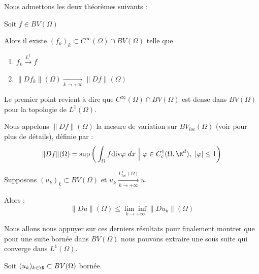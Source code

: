 \vspace{1em}

Nous admettons les deux théorèmes suivants :

\begin{theorembox}
\begin{theorem}
    Soit $f \in BV(\Omega)$

    Alors il existe $(f_k)_k \subset C^{\infty}(\Omega) \cap BV(\Omega)$ telle que 
    \begin{enumerate}
        \item $f_k \xrightarrow{L^1} f$
        \item $\| Df_k \| (\Omega) \underset{k \to +\infty}{\longrightarrow} \| Df \| (\Omega)$
    \end{enumerate}

\end{theorem}
\end{theorembox}

\begin{remarkbox}
\begin{remark}
    Le premier point revient à dire que $C^{\infty}(\Omega) \cap BV(\Omega)$ est dense dans $BV(\Omega)$ pour la topologie de $L^1(\Omega)$.

    \vspace{1em}
    Nous appelons $\|Df\|(\Omega)$ la mesure de variation sur $BV_{loc}(\Omega)$ (voir \cite{Evans} pour plus de détails), définie par :
    $$\|Df\| (\Omega) = \sup \bigg(\int_{\Omega} f \text{div}\varphi \ dx \ \Big| \ \varphi \in C^1_c(\Omega,\R^d), \ |\varphi| \leq 1 \bigg)$$
\end{remark}
\end{remarkbox}

\begin{theorembox}
\begin{theorem}
    
    Supposons $(u_k)_k \subset BV(\Omega)$ et $u_k \xrightarrow[k \to +\infty]{L^1_{loc}(\Omega)} u$.

    Alors :
    $$ \| Du \|(\Omega) \leq \underset{k \to +\infty}{\lim \inf}\|Du_k\|(\Omega) $$

\end{theorem}
\end{theorembox}

Nous allons nous appuyer sur ces derniers résultats pour finalement montrer que pour une suite bornée dans $BV(\Omega)$ nous pouvons extraire une sous suite qui converge dans $L^1(\Omega)$. 

Soit $(u_k)_{k \in \N} \subset BV(\Omega)$ bornée.

